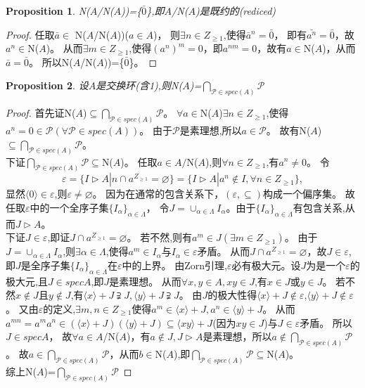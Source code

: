 \documentclass[UTF8]{article}
\newtheorem{prop}{Proposition}[section]
\begin{document}
\begin{prop}
	N($A$/N($A$))=\{$\bar 0$\},即$A$/N($A$)是既约的(rediced)
\end{prop}
\begin{proof}
	任取$\bar a\in$ N($A$/N($A$))($a\in A$)，
	则$\exists n\in Z_{\geq 1}$,使得$\bar a^n=\bar0$，
	即有$\bar {a^n}=\bar0$，故$a^n\in$N($A$)。
	从而$\exists m\in Z_{\geq1}$,使得$(a^n)^m=0$，即$ a^{nm}=0$，故有$ a\in$N($A$)，从而$\bar a=\bar0$。
	所以N($A$/N($A$))=\{$\bar0$\}。
\end{proof}

\begin{prop}
	设$A$是交换环(含1),则N($A$)=$\bigcap_{\mathcal P\in spec(A)}\mathcal P$
\end{prop}
\begin{proof}
	首先证N($A$)$\subseteq\bigcap_{\mathcal P\in spec(A)}\mathcal P$。
	$\forall a\in$N($A$)$\exists n\in Z_{\geq1}$,使得$a^n=0\in\mathcal P(\forall\mathcal P\in spec(A))$。
	由于$\mathcal P$是素理想,所以$a\in\mathcal P$。
	故有N($A$)$\subseteq\bigcap_{\mathcal P\in spec(A)}\mathcal P$。
	\\下证$\bigcap_{\mathcal P\in spec(A)}\mathcal P\subseteq$N($A$)。
	任取$a\in A/$N($A$),则$\forall n\in Z_{\geq1}$,有$a^n\neq 0$。
	令$$\varepsilon=\{I\vartriangleright A|n\cap a^{Z_{\geq1}}=\varnothing\}=\{I\vartriangleright A|a^n\notin I,\forall n\in Z_{\geq1} \},$$
	显然$\langle0\rangle\in\varepsilon$,则$\varepsilon\neq\varnothing$。
	因为在通常的包含关系下，$(\varepsilon ,\subseteq)$构成一个偏序集。
	故任取$\varepsilon$中的一个全序子集$\{I_\alpha\}_{\alpha\in\Lambda}$，
	令$J=\cup_{\alpha\in\Lambda}I_\alpha$。由于$\{I_\alpha\}_{\alpha\in\Lambda}$有包含关系,从而$J\vartriangleright A$。
	\\下证$J\in\varepsilon$,即证$J\cap a^{Z_{\geq1}}=\varnothing$。
	若不然,则有$a^m\in J(\exists m\in Z_{\geq1})$。
	由于$J=\cup_{\alpha\in\Lambda}I_\alpha$,则$\exists\alpha\in\Lambda$,使得$a^m\in I_\alpha$与$I_\alpha\in\varepsilon$矛盾。
	从而$J\cap a^{Z_{\geq1}}=\varnothing$，故$J\in\varepsilon$,即$J$是全序子集$\{I_\alpha\}_{\alpha\in\Lambda}$在$\varepsilon$中的上界。
	由Zorn引理,$\varepsilon$必有极大元。设$J$为是一个$\varepsilon$的极大元,且$J\in spec A$,即$J$是素理想。
	从而$\forall x,y\in A,xy\in J$,有$x\in J$或$y\in J$。
	若不然$x\notin J$且$y\notin J$,有$\langle x\rangle+J\supsetneqq J,\langle y\rangle+J\supsetneqq J$。
	由$J$的极大性得$\langle x\rangle+J\notin\varepsilon$,$\langle y\rangle+J\notin\varepsilon$。
	又由$\varepsilon$的定义,$\exists m,n\in Z_{\geq1}$使得$a^m\in\langle x\rangle+J,a^n\in\langle y\rangle+J$。
	从而$a^{mn}=a^{m}a^{n}\in(\langle x\rangle+J)(\langle y\rangle+J)\subseteq\langle {xy}\rangle+J$(因为$xy\in J$)与$J\in\varepsilon$矛盾。
	所以$J\in spec A$，
	故$\forall a\in A$/N($A$)，有$a\notin J,J\vartriangleright A$是素理想，所以$a\notin\bigcap_{\mathcal P\in spec(A)}\mathcal P$。
	故$a\in \bigcap_{\mathcal P\in spec(A)}\mathcal P$，从而$ b\in$N($A$),即$\bigcap_{\mathcal P\in spec(A)}\mathcal P\subseteq$N($A$)。
	\\综上N($A$)=$\bigcap_{\mathcal P\in spec(A)}\mathcal P$
\end{proof}
\end{document}
